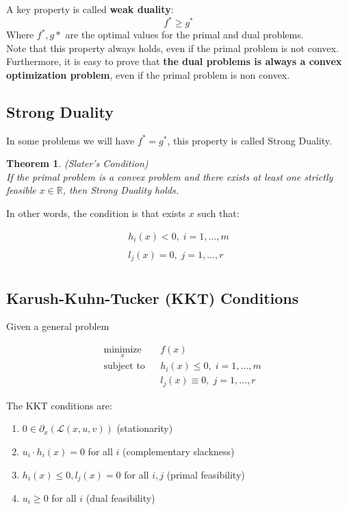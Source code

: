 \documentclass[twoside]{article}
\newcounter{lecnum}
\newtheorem{theorem}{Theorem}[lecnum]
\begin{document}
 A key property is called \textbf{weak duality}: 
\begin{equation*}
    f^{*} \geq g^{*}
\end{equation*}
Where $f^{*},g{*}$ are the optimal values for the primal and dual problems.\\Note that this property always holds, even if the primal problem is not convex. Furthermore, it is easy to prove that  \textbf{the dual problems is always a convex optimization problem}, even if the primal problem is non convex.

\newpage
\subsection{Strong Duality}
In some problems we will have $f^{*}=g^{*}$, this property is called Strong Duality.

\begin{theorem}{(Slater's Condition)}
\\If the primal problem is a convex problem
and there exists at least one strictly feasible $x \in \mathbb{R} $, then Strong Duality holds.
\end{theorem}

In other words, the condition is that exists $x$ such that:

\begin{align*}
       h_i(x) < 0, \; i = 1, \ldots, m \\\\        
    l_j (x) = 0,\; j = 1, \ldots, r \\ 
\end{align*}



\subsection{Karush-Kuhn-Tucker (KKT) Conditions}

Given a general problem

\begin{equation*}
\begin{aligned}
& \underset{x}{\text{minimize}}
& & f(x) \\
& \text{subject to}
& & h_i(x) \leq 0, \; i = 1, \ldots, m \\
&&& l_j(x)\equiv 0, \; j = 1, \ldots, r
\end{aligned}
\end{equation*}

The KKT conditions are:
\begin{enumerate}
    \item $0 \in \partial_x (\mathcal{L}(x, u, v)  )$ (stationarity)
    \item $u_i \cdot h_i(x) = 0$ for all $i$ (complementary slackness)
    \item $h_i(x) \leq 0,  l_j(x)  = 0$ for all $i,j$ (primal feasibility)
    \item $u_i \geq 0$ for all $i$ (dual feasibility)
\end{enumerate}
\end{document}
